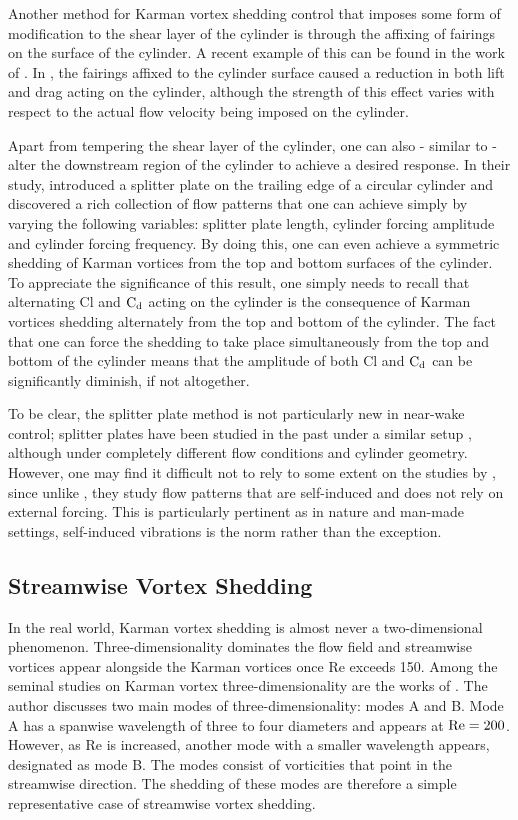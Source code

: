 \documentclass[oneside]{utmthesis}
\begin{document}
Another method for Karman vortex shedding control that imposes some form of modification to the shear layer of the cylinder is through the affixing of fairings on the surface of the cylinder. A recent example of this can be found in the work of \citet{Kang2020}. In \citet{Kang2020}, the fairings affixed to the cylinder surface caused a reduction in both lift and drag acting on the cylinder, although the strength of this effect varies with respect to the actual flow velocity being imposed on the cylinder.

Apart from tempering the shear layer of the cylinder, one can also - similar to \citet{Yokoi2016} - alter the downstream region of the cylinder to achieve a desired response. In their study, \citet{Yokoi2016} introduced a splitter plate on the trailing edge of a circular cylinder and discovered a rich collection of flow patterns that one can achieve simply by varying the following variables: splitter plate length, cylinder forcing amplitude and cylinder forcing frequency. By doing this, one can even achieve a symmetric shedding of Karman vortices from the top and bottom surfaces of the cylinder. To appreciate the significance of this result, one simply needs to recall that alternating Cl and $\text{C}_{\text{d}}$ acting on the cylinder is the consequence of Karman vortices shedding alternately from the top and bottom of the cylinder. The fact that one can force the shedding to take place simultaneously from the top and bottom of the cylinder means that the amplitude of both Cl and $\text{C}_{\text{d}}$ can be significantly diminish, if not altogether.

To be clear, the splitter plate method is not particularly new in near-wake control; splitter plates have been studied in the past under a similar setup \citep{MatAli2011,MatAli2012}, although under completely different flow conditions and cylinder geometry. However, one may find it difficult not to rely to some extent on the studies by \citet{MatAli2011,MatAli2012}, since unlike \citet{Yokoi2016}, they study flow patterns that are self-induced and does not rely on external forcing. This is particularly pertinent as in nature and man-made settings, self-induced vibrations is the norm rather than the exception.

\subsection{Streamwise Vortex Shedding} \label{ssec:svShedding}
In the real world, Karman vortex shedding is almost never a two-dimensional phenomenon. Three-dimensionality dominates the flow field and streamwise vortices appear alongside the Karman vortices once Re exceeds 150. Among the seminal studies on Karman vortex three-dimensionality are the works of \citet{Williamson1996a,Williamson1996b}. The author discusses two main modes of three-dimensionality: modes A and B. Mode A has a spanwise wavelength of three to four diameters and appears at $\text{Re} = 200$. However, as Re is increased, another mode with a smaller wavelength appears, designated as mode B. The modes consist of vorticities that point in the streamwise direction. The shedding of these modes are therefore a simple representative case of streamwise vortex shedding.
\end{document}
